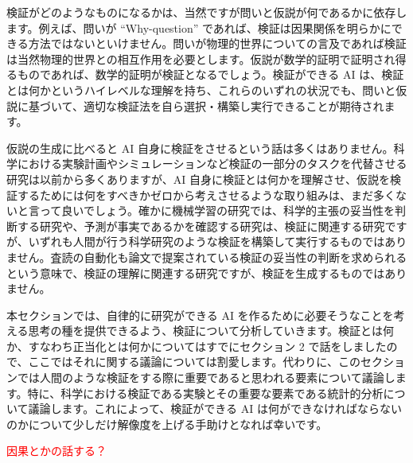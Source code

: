 検証がどのようなものになるかは、当然ですが問いと仮説が何であるかに依存します。例えば、問いが ``Why-question'' であれば、検証は因果関係を明らかにできる方法ではないといけません。問いが物理的世界についての言及であれば検証は当然物理的世界との相互作用を必要とします。仮説が数学的証明で証明され得るものであれば、数学的証明が検証となるでしょう。検証ができる AI は、検証とは何かというハイレベルな理解を持ち、これらのいずれの状況でも、問いと仮説に基づいて、適切な検証法を自ら選択・構築し実行できることが期待されます。

仮説の生成に比べると AI 自身に検証をさせるという話は多くはありません。科学における実験計画やシミュレーションなど検証の一部分のタスクを代替させる研究は以前から多くありますが、AI 自身に検証とは何かを理解させ、仮説を検証するためには何をすべきかゼロから考えさせるような取り組みは、まだ多くないと言って良いでしょう。確かに機械学習の研究では、科学的主張の妥当性を判断する研究や、予測が事実であるかを確認する研究は、検証に関連する研究ですが、いずれも人間が行う科学研究のような検証を構築して実行するものではありません。査読の自動化も論文で提案されている検証の妥当性の判断を求められるという意味で、検証の理解に関連する研究ですが、検証を生成するものではありません。

本セクションでは、自律的に研究ができる AI を作るために必要そうなことを考える思考の種を提供できるよう、検証について分析していきます。検証とは何か、すなわち正当化とは何かについてはすでにセクション 2 で話をしましたので、ここではそれに関する議論については割愛します。代わりに、このセクションでは人間のような検証をする際に重要であると思われる要素について議論します。特に、科学における検証である実験とその重要な要素である統計的分析について議論します。これによって、検証ができる AI は何ができなければならないのかについて少しだけ解像度を上げる手助けとなれば幸いです。

\textcolor{red}{因果とかの話する？}



